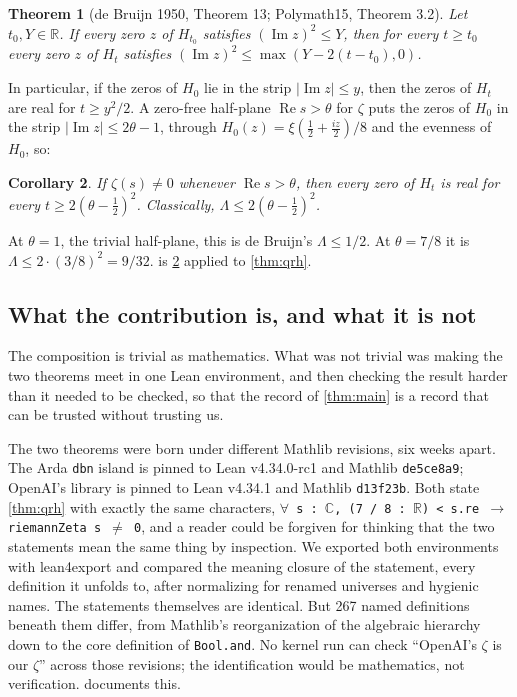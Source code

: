 \documentclass[11pt]{article}
\newtheorem{theorem}{Theorem}
\newtheorem{corollary}[theorem]{Corollary}
\theoremstyle{definition}
\newcommand{\lean}[1]{\texttt{#1}}
\newcommand{\Lam}{\Lambda}
\newcommand{\Hfun}{H}
\newcommand{\re}{\operatorname{Re}}
\newcommand{\im}{\operatorname{Im}}
\newcommand{\C}{\mathbb{C}}
\newcommand{\R}{\mathbb{R}}
\begin{document}
\begin{theorem}[de Bruijn 1950, Theorem 13; Polymath15, Theorem 3.2]\label{thm:dB}
Let $t_0, Y \in \R$. If every zero $z$ of $\Hfun_{t_0}$ satisfies $(\im z)^2 \le Y$, then for every $t \ge t_0$ every zero $z$ of $\Hfun_t$ satisfies $(\im z)^2 \le \max(Y - 2(t - t_0), 0)$.
\end{theorem}

In particular, if the zeros of $\Hfun_0$ lie in the strip $|\im z| \le y$, then the zeros of $\Hfun_t$ are real for $t \ge y^2/2$. A zero-free half-plane $\re s > \theta$ for $\zeta$ puts the zeros of $\Hfun_0$ in the strip $|\im z| \le 2\theta - 1$, through $\Hfun_0(z) = \xi(\tfrac12 + \tfrac{iz}{2})/8$ and the evenness of $\Hfun_0$, so:

\begin{corollary}\label{cor:conv}
If $\zeta(s) \ne 0$ whenever $\re s > \theta$, then every zero of $\Hfun_t$ is real for every $t \ge 2(\theta - \tfrac12)^2$. Classically, $\Lam \le 2(\theta - \tfrac12)^2$.
\end{corollary}

At $\theta = 1$, the trivial half-plane, this is de Bruijn's $\Lam \le 1/2$. At $\theta = 7/8$ it is $\Lam \le 2 \cdot (3/8)^2 = 9/32$.  is \cref{cor:conv} applied to \cref{thm:qrh}.

\subsection{What the contribution is, and what it is not}

The composition is trivial as mathematics. What was not trivial was making the two theorems meet in one Lean environment, and then checking the result harder than it needed to be checked, so that the record of \cref{thm:main} is a record that can be trusted without trusting us.

The two theorems were born under different Mathlib revisions, six weeks apart. The Arda \lean{dbn} island is pinned to Lean v4.34.0-rc1 and Mathlib \lean{de5ce8a9}; OpenAI's library is pinned to Lean v4.34.1 and Mathlib \lean{d13f23b}. Both state \cref{thm:qrh} with exactly the same characters, \lean{$\forall$ s : $\C$, (7 / 8 : $\R$) < s.re $\to$ riemannZeta s $\neq$ 0}, and a reader could be forgiven for thinking that the two statements mean the same thing by inspection. We exported both environments with lean4export and compared the meaning closure of the statement, every definition it unfolds to, after normalizing for renamed universes and hygienic names. The statements themselves are identical. But 267 named definitions beneath them differ, from Mathlib's reorganization of the algebraic hierarchy down to the core definition of \lean{Bool.and}. No kernel run can check ``OpenAI's $\zeta$ is our $\zeta$'' across those revisions; the identification would be mathematics, not verification.  documents this.
\end{document}
